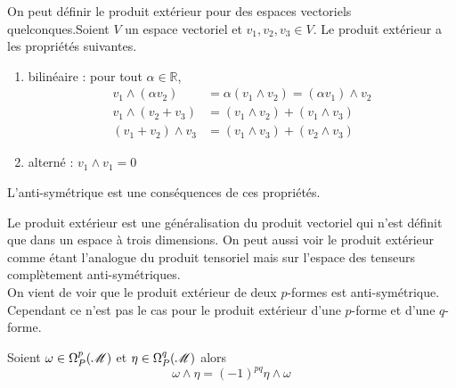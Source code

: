 \documentclass[a4paper,11pt]{report}
\begin{document}
            \begin{rmk}
                On peut définir le produit extérieur pour des espaces vectoriels quelconques.Soient $V$ un espace vectoriel et $v_1,v_2,v_3\in V$. Le produit extérieur a les propriétés suivantes.
                \begin{enumerate}[label = \textit{\roman*)}]
                    \item bilinéaire : pour tout $\alpha\in\mathbb{R}$,
                    \begin{align}
                        v_1\wedge (\alpha v_2) &= \alpha(v_1\wedge v_2) = (\alpha v_1)\wedge v_2\\
                        v_1\wedge(v_2+v_3) &= (v_1\wedge v_2) + (v_1\wedge v_3)\\
                        (v_1+v_2)\wedge v_3 &= (v_1\wedge v_3) + (v_2\wedge v_3)
                    \end{align}
                    \item alterné : $v_1 \wedge v_1 = 0$
                    \end{enumerate}
                L'anti-symétrique est une conséquences de ces propriétés.
            \end{rmk}
            
            Le produit extérieur est une généralisation du produit vectoriel qui n'est définit que dans un espace à trois dimensions. On peut aussi voir le produit extérieur comme étant l'analogue du produit tensoriel mais sur l'espace des tenseurs complètement anti-symétriques.\\
            
            On vient de voir que le produit extérieur de deux $p$-formes est anti-symétrique. Cependant ce n'est pas le cas pour le produit extérieur d'une $p$-forme et d'une $q$-forme.
            
            \begin{prop}\begin{leftbar}
                Soient $\omega\in\Omega_P^p(\mathscr{M})$ et $\eta\in \Omega_P^q(\mathscr{M})$ alors
                \begin{equation}
                    \omega\wedge\eta = (-1)^{pq}\eta\wedge\omega
                \end{equation}
            \end{leftbar}\end{prop}
            
\end{document}
